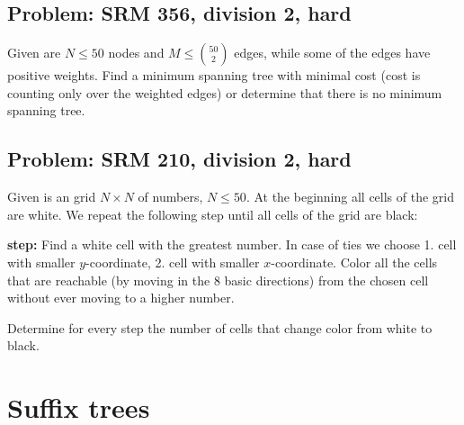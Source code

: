 \documentclass[a4paper, twoside,openany]{book}
\begin{document}
\subsection{Problem: SRM 356, division 2, hard}
Given are $N\leq 50$ nodes and $M \leq \binom{50}{2}$ edges, while some of the edges have positive weights.
Find a minimum spanning tree with minimal cost (cost is counting only over the weighted edges) or determine that there is no minimum spanning tree.

\subsection{Problem: SRM 210, division 2, hard}
Given is an grid $N \times N$ of numbers, $N \leq 50$.
At the beginning all cells of the grid are white.
We repeat the following step until all cells of the grid are black:

{\textbf{step:}} Find a white cell with the greatest number. In case of ties we choose 1. cell with smaller $y$-coordinate, 2. cell with smaller $x$-coordinate.
Color all the cells that are reachable (by moving in the 8 basic directions) from the chosen cell without ever moving to a higher number.

Determine for every step the number of cells that change color from white to black.


\section{Suffix trees}
 
\end{document}

